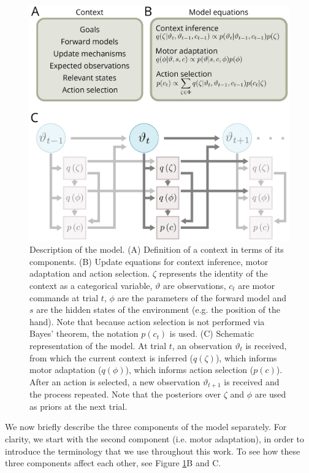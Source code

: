\documentclass[a4paper,doc,floatsintext,natbib]{apa6}
\def \fref #1{Figure \ref{#1}}     %
\begin{document}
\begin{figure}
\centering
\includegraphics[]{./figures/figure_1.png}
\caption{Description of the model. (A) Definition of a context in terms of its components. (B) Update equations for context inference, motor adaptation and action selection. $\zeta$ represents the identity of the context as a categorical variable, $\vartheta$ are observations, $c_t$ are motor commands at trial $t$, $\phi$ are the parameters of the forward model and $s$ are the hidden states of the environment (e.g. the position of the hand). Note that because action selection is not performed via Bayes' theorem, the notation $p(c_t)$ is used. (C) Schematic representation of the model. At trial $t$, an observation $\vartheta_t$ is received, from which the current context is inferred ($q(\zeta)$), which informs motor adaptation ($q(\phi)$), which informs action selection ($p(c)$). After an action is selected, a new observation $\vartheta_{t+1}$ is received and the process repeated. Note that the posteriors over $\zeta$ and $\phi$ are used as priors at the next trial.}
\label{fig:model}
\end{figure}

We now briefly describe the three components of the model separately. For clarity, we start with the second component (i.e. motor adaptation), in order to introduce the terminology that we use throughout this work. To see how these three components affect each other, see \fref{fig:model}B and C.
\end{document}
